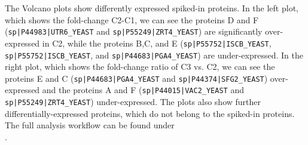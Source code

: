 \noindent The Volcano plots show differently expressed spiked-in proteins. In the left plot, which shows
the fold-change C2-C1, we
can see the proteins D and F (\texttt{sp|P44983|UTR6\_YEAST}
and \texttt{sp|P55249|ZRT4\_YEAST}) are significantly over-expressed in C2, while
 the proteins B,C, and E (\texttt{sp|P55752|ISCB\_YEAST}, \texttt{sp|P55752|ISCB\_YEAST},
 and \texttt{sp|P44683|PGA4\_YEAST}) are under-expressed.
 In the right plot, which shows the fold-change ratio of C3 vs. C2, we
 can see the proteins E and C (\texttt{sp|P44683|PGA4\_YEAST} and \texttt{sp|P44374|SFG2\_YEAST})
 over-expressed and the proteins A and F (\texttt{sp|P44015|VAC2\_YEAST} and
 \texttt{sp|P55249|ZRT4\_YEAST}) under-expressed. 
The plots also show further differentially-expressed proteins,
which do not belong to the spiked-in proteins. \\


\noindent The full analysis workflow can be found under\\
.
